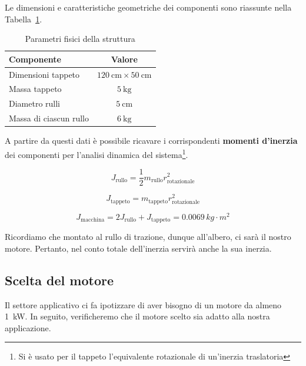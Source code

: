 \documentclass[a4paper,12pt]{article}
\begin{document}
\vspace{0.5cm}

Le dimensioni e caratteristiche geometriche dei componenti sono riassunte nella Tabella~\ref{tab:dati}.

\begin{table}[h!]
    \centering
    \begin{tabular}{|l|c|}
        \hline
        \textbf{Componente} & \textbf{Valore} \\
        \hline
        Dimensioni tappeto & $120\ \text{cm} \times 50\ \text{cm}$ \\
        Massa tappeto & $5\ \text{kg}$ \\
        Diametro rulli & $5\ \text{cm}$ \\
        Massa di ciascun rullo & $6\ \text{kg}$ \\
        \hline
    \end{tabular}
    \caption{Parametri fisici della struttura}
    \label{tab:dati}
\end{table}
\vspace{0.5cm}
 
A partire da questi dati è possibile ricavare i corrispondenti \textbf{momenti d'inerzia} dei componenti per l'analisi dinamica del sistema\footnote{Si è usato per il tappeto l'equivalente rotazionale di un'inerzia traslatoria}.

\vspace{0.5cm}

\[
    J_{\text{rullo}} = \frac{1}{2} m_{\text{rullo}} r_{\text{rotazionale}}^2
\]

\[
    J_{\text{tappeto}} = m_{\text{tappeto}} r_{\text{rotazionale}}^2
\]

\[
    J_{\text{macchina}} = 2 J_{\text{rullo}} + J_{\text{tappeto}} = 0.0069\, kg\cdot m^2
\]

\vspace{0.5cm}

Ricordiamo che montato al rullo di trazione, dunque all'albero, ci sarà il nostro motore. Pertanto, nel conto totale dell'inerzia servirà anche la sua inerzia.


\subsection{Scelta del motore}

Il settore applicativo ci fa ipotizzare di aver bisogno di un motore da almeno 1~kW. In seguito, verificheremo che il motore scelto sia adatto alla nostra applicazione.
\end{document}
